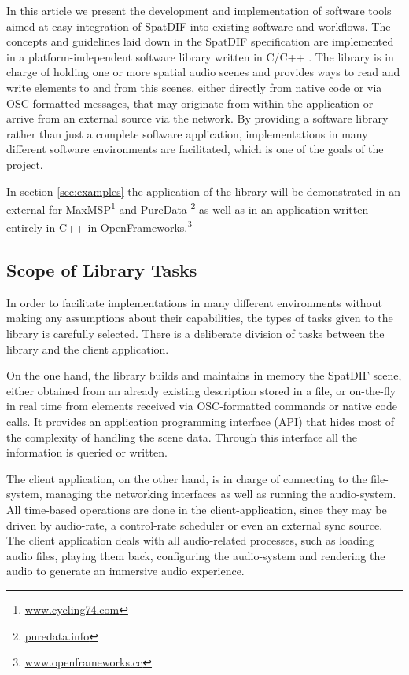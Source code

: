 \documentclass{article}
\begin{document}
In this article we present the development and implementation of software tools aimed at easy integration of SpatDIF into existing software and workflows.
The concepts and guidelines laid down in the SpatDIF specification are implemented in a platform-independent software library written in C/C++ \cite{Miyama_2013}.
The library is in charge of holding one or more spatial audio scenes and provides ways to read and write elements to and from this scenes, either directly from native code or via OSC-formatted messages, that may originate from within the application or arrive from an external source via the network.
By providing a software library rather than just a complete software application, implementations in many different software environments are facilitated, which is one of the goals of the project.

In section \ref{sec:examples} the application of the library will be demonstrated in an external for MaxMSP\footnote{\href{http://www.cycling74.com}{www.cycling74.com}} and PureData \footnote{\href{http://puredata.info}{puredata.info}} as well as in an application written entirely in C++ in OpenFrameworks.\footnote{\href{http://www.openframeworks.cc}{www.openframeworks.cc}}

\subsection{Scope of Library Tasks}\label{subsec:separation}

In order to facilitate implementations in many different environments without making any assumptions about their capabilities, the types of tasks given to the library is carefully selected.
There is a deliberate division of tasks between the library and the client application.

On the one hand, the library builds and maintains in memory the SpatDIF scene, either obtained from an already existing description stored in a file, or on-the-fly in real time from elements received via OSC-formatted commands or native code calls.
It provides an application programming interface (API) that hides most of the complexity of handling the scene data.
Through this interface all the information is queried or written.

The client application, on the other hand, is in charge of connecting to the file-system, managing the networking interfaces as well as running the audio-system.
All time-based operations are done in the client-application, since they may be driven by audio-rate, a control-rate scheduler or even an external sync source. 
The client application deals with all audio-related processes, such as loading audio files, playing them back, configuring the audio-system and rendering the audio to generate an immersive audio experience.
\end{document}
